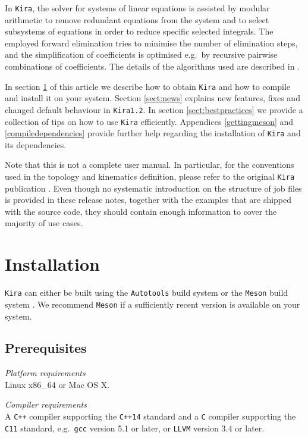 \documentclass[a4paper,12pt]{article}
\newcommand*{\kira}{\texttt{Kira}}
\begin{document}
In \kira{}, the solver for systems of linear equations is assisted by modular
arithmetic to remove redundant equations from the system and to select
subsystems of equations in order to reduce specific selected integrals.
The employed forward elimination tries to minimise the number of elimination
steps, and the simplification of coefficients is optimised e.g.\ by recursive
pairwise combinations of coefficients.
The details of the algorithms used are described in \cite{Maierhoefer:2017hyi}.

In section \ref{sect:installation} of this article we describe how to obtain
\kira{} and how to compile and install it on your system.
Section \ref{sect:news} explains new features, fixes and changed default
behaviour in \kira{}\;\texttt{1.2}.
In section \ref{sect:bestpractices} we provide a collection of tips on how to
use \kira{} efficiently.
Appendices \ref{gettingmeson} and \ref{compiledependencies} provide further help
regarding the installation of \kira{} and its dependencies.

Note that this is not a complete user manual.
In particular, for the conventions used in the topology and kinematics
definition, please refer to the original \kira{} publication
\cite{Maierhoefer:2017hyi}.
Even though no systematic introduction on the structure of job files is provided
in these release notes, together with the examples that are shipped with the
source code, they should contain enough information to cover the majority of use
cases.

\clearpage

\section{Installation}
\label{sect:installation}

\kira{} can either be built using the \texttt{Autotools} build system or the
\texttt{Meson} build system \cite{Meson}.
We recommend \texttt{Meson} if a sufficiently recent version is available on
your system.


\subsection{Prerequisites}

\noindent
\textit{Platform requirements}\smallskip\\
Linux x86\_64 or Mac OS X.

\medskip
\noindent
\textit{Compiler requirements}\smallskip\\
A \texttt{C++} compiler supporting the \texttt{C++14} standard and a \texttt{C}
compiler supporting the \texttt{C11} standard, e.g.\ \texttt{gcc} version 5.1 or
later, or \texttt{LLVM} version 3.4 or later.
\end{document}
